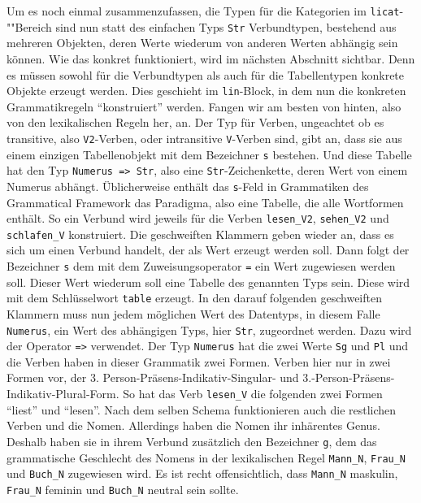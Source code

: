 Um es noch einmal zusammenzufassen, die Typen für die Kategorien im \texttt{licat}-""Bereich sind nun statt des einfachen Typs \texttt{Str} Verbundtypen, bestehend aus mehreren Objekten, deren Werte wiederum von anderen Werten abhängig sein können. Wie das konkret funktioniert, wird im nächsten Abschnitt sichtbar. Denn es müssen sowohl für die Verbundtypen als auch für die Tabellentypen konkrete Objekte erzeugt werden. Dies geschieht im \texttt{lin}-Block, in dem nun die konkreten Grammatikregeln "`konstruiert"' werden. Fangen wir am besten von hinten, also von den lexikalischen Regeln her, an. Der Typ für Verben, ungeachtet ob es transitive, also \texttt{V2}-Verben, oder intransitive \texttt{V}-Verben sind, gibt an, dass sie aus einem einzigen Tabellenobjekt mit dem Bezeichner \texttt{s} bestehen. Und diese Tabelle hat den Typ \texttt{Numerus => Str}, also eine \texttt{Str}-Zeichenkette, deren Wert von einem Numerus abhängt. Üblicherweise enthält das \texttt{s}-Feld in Grammatiken des Grammatical Framework das Paradigma, also eine Tabelle, die alle Wortformen enthält. So ein Verbund wird jeweils für die Verben \texttt{lesen\_V2}, \texttt{sehen\_V2} und \texttt{schlafen\_V} konstruiert. Die geschweiften Klammern geben wieder an, dass es sich um einen Verbund handelt, der als Wert erzeugt werden soll. Dann folgt der Bezeichner \texttt{s} dem mit dem Zuweisungsoperator \texttt{=} ein Wert zugewiesen werden soll. Dieser Wert wiederum soll eine Tabelle des genannten Typs sein. Diese wird mit dem Schlüsselwort \texttt{table} erzeugt. In den darauf folgenden geschweiften Klammern muss nun jedem möglichen Wert des Datentyps, in diesem Falle \texttt{Numerus}, ein Wert des abhängigen Typs, hier \texttt{Str}, zugeordnet werden. Dazu wird der Operator \texttt{=>} verwendet. Der Typ \texttt{Numerus} hat die zwei Werte \texttt{Sg} und \texttt{Pl} und die Verben haben in dieser Grammatik zwei Formen. Verben hier nur in zwei Formen vor, der 3. Person-Präsens-Indikativ-Singular- und 3.-Person-Präsens-Indikativ-Plural-Form. So hat das Verb \texttt{lesen\_V} die folgenden zwei Formen "`liest"' und "`lesen"'. Nach dem selben Schema funktionieren auch die restlichen Verben und die Nomen. Allerdings haben die Nomen ihr inhärentes Genus. Deshalb haben sie in ihrem Verbund zusätzlich den Bezeichner \texttt{g}, dem das grammatische Geschlecht des Nomens in der lexikalischen Regel \texttt{Mann\_N}, \texttt{Frau\_N} und \texttt{Buch\_N} zugewiesen wird. Es ist recht offensichtlich, dass \texttt{Mann\_N} maskulin, \texttt{Frau\_N} feminin und \texttt{Buch\_N} neutral sein sollte. \par
